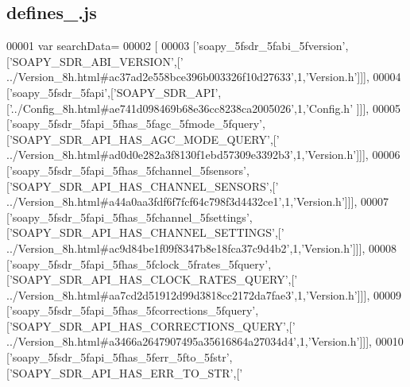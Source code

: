 \subsection{defines\+\_.\+js}
\label{defines__0_8js_source}

\begin{DoxyCode}
00001 var searchData=
00002 [
00003   [\textcolor{stringliteral}{'soapy\_5fsdr\_5fabi\_5fversion'},[\textcolor{stringliteral}{'SOAPY\_SDR\_ABI\_VERSION'},[\textcolor{stringliteral}{'
      ../Version\_8h.html#ac37ad2e558bce396b003326f10d27633'},1,\textcolor{stringliteral}{'Version.h'}]]],
00004   [\textcolor{stringliteral}{'soapy\_5fsdr\_5fapi'},[\textcolor{stringliteral}{'SOAPY\_SDR\_API'},[\textcolor{stringliteral}{'../Config\_8h.html#ae741d098469b68e36cc8238ca2005026'},1,\textcolor{stringliteral}{'Config.h'}
      ]]],
00005   [\textcolor{stringliteral}{'soapy\_5fsdr\_5fapi\_5fhas\_5fagc\_5fmode\_5fquery'},[\textcolor{stringliteral}{'SOAPY\_SDR\_API\_HAS\_AGC\_MODE\_QUERY'},[\textcolor{stringliteral}{'
      ../Version\_8h.html#ad0d0e282a3f8130f1ebd57309e3392b3'},1,\textcolor{stringliteral}{'Version.h'}]]],
00006   [\textcolor{stringliteral}{'soapy\_5fsdr\_5fapi\_5fhas\_5fchannel\_5fsensors'},[\textcolor{stringliteral}{'SOAPY\_SDR\_API\_HAS\_CHANNEL\_SENSORS'},[\textcolor{stringliteral}{'
      ../Version\_8h.html#a44a0aa3fdf6f7fcf64c798f3d4432ce1'},1,\textcolor{stringliteral}{'Version.h'}]]],
00007   [\textcolor{stringliteral}{'soapy\_5fsdr\_5fapi\_5fhas\_5fchannel\_5fsettings'},[\textcolor{stringliteral}{'SOAPY\_SDR\_API\_HAS\_CHANNEL\_SETTINGS'},[\textcolor{stringliteral}{'
      ../Version\_8h.html#ac9d84be1f09f8347b8e18fca37c9d4b2'},1,\textcolor{stringliteral}{'Version.h'}]]],
00008   [\textcolor{stringliteral}{'soapy\_5fsdr\_5fapi\_5fhas\_5fclock\_5frates\_5fquery'},[\textcolor{stringliteral}{'SOAPY\_SDR\_API\_HAS\_CLOCK\_RATES\_QUERY'},[\textcolor{stringliteral}{'
      ../Version\_8h.html#aa7cd2d51912d99d3818cc2172da7fae3'},1,\textcolor{stringliteral}{'Version.h'}]]],
00009   [\textcolor{stringliteral}{'soapy\_5fsdr\_5fapi\_5fhas\_5fcorrections\_5fquery'},[\textcolor{stringliteral}{'SOAPY\_SDR\_API\_HAS\_CORRECTIONS\_QUERY'},[\textcolor{stringliteral}{'
      ../Version\_8h.html#a3466a2647907495a35616864a27034d4'},1,\textcolor{stringliteral}{'Version.h'}]]],
00010   [\textcolor{stringliteral}{'soapy\_5fsdr\_5fapi\_5fhas\_5ferr\_5fto\_5fstr'},[\textcolor{stringliteral}{'SOAPY\_SDR\_API\_HAS\_ERR\_TO\_STR'},[\textcolor{stringliteral}{'
}
\end{DoxyCode}
